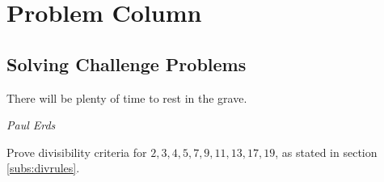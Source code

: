 \documentclass[problems.tex]{subfile}
\begin{document}
\part{Problem Column}
	\chapter{Solving Challenge Problems}\label{ch:solved}

	\epigraph{There will be plenty of time to rest in the grave.}{\textit{Paul Erds}}
	

	\begin{problem}
		Prove divisibility criteria for $2,3,4,5,7,9,11,13,17,19$, as stated in section \eqref{subs:divrules}\watermark.
	\end{problem}
	
\end{document}
